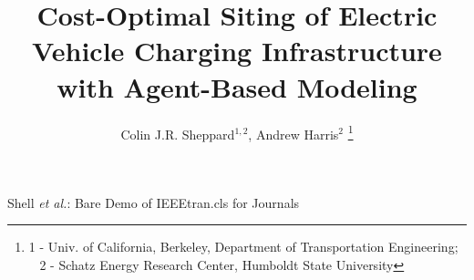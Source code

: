 \documentclass[journal]{IEEEtran}
\begin{document}
%
\title{Cost-Optimal Siting of Electric Vehicle Charging Infrastructure with Agent-Based Modeling}
%
%
%

\author{Colin J.R. Sheppard$^{1,2}$, Andrew Harris$^2$%
\thanks{1 - Univ. of California, Berkeley, Department of Transportation Engineering; ~ 2 - Schatz Energy Research Center, Humboldt State University}}

% 
%



%
{Shell \MakeLowercase{\textit{et al.}}: Bare Demo of IEEEtran.cls for Journals}
% 
\end{document}
